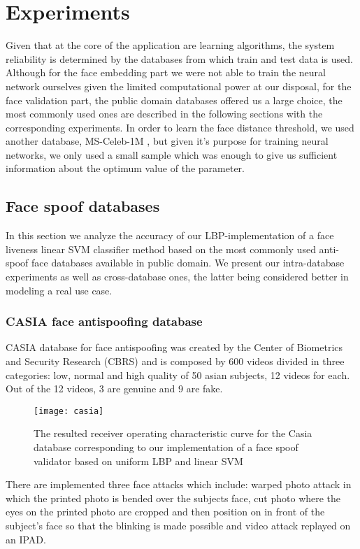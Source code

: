 \chapter{Experiments}
Given that at the core of the application are learning algorithms, the system reliability is determined by the databases from which train and test data is used. Although for the face embedding part we were not able to train the neural network ourselves given the limited computational power at our disposal, for the face validation part, the public domain databases offered us a large choice, the most commonly used ones are described in the following sections with the corresponding experiments. In order to learn the face distance threshold, we used another database, MS-Celeb-1M \cite{guo2016msceleb}, but given it's purpose for training neural networks, we only used a small sample which was enough to give us sufficient information about the optimum value of the parameter.
\section{Face spoof databases}
In this section we analyze the accuracy of our LBP-implementation of a face liveness linear SVM classifier method based on the most commonly used anti-spoof face databases available in public domain. We present our intra-database experiments as well as cross-database ones, the latter being considered better in modeling a real use case.
\subsection{CASIA face antispoofing database }
CASIA database for face antispoofing was created by the Center of Biometrics and Security Research (CBRS) and is composed by 600 videos divided in three categories: low, normal and high quality of 50 asian subjects, 12 videos for each. Out of the 12 videos, 3 are genuine and 9 are fake.
\begin{wrapfigure}{r}{10cm}
	\captionsetup{width=10cm,font=small}
	\texttt{[image: casia]}
	\caption[CASIA database reported ROC curve]{The resulted receiver operating characteristic curve for the Casia database corresponding to our implementation of a face spoof validator based on uniform LBP and linear SVM}
	\label{fig:casia_roc}
\end{wrapfigure}

There are implemented three face attacks which include: warped photo attack in which the printed photo is bended over the subjects face, cut photo where the eyes on the printed photo are cropped and then position on in front of the subject's face so that the blinking is made possible and video attack replayed on an IPAD.

